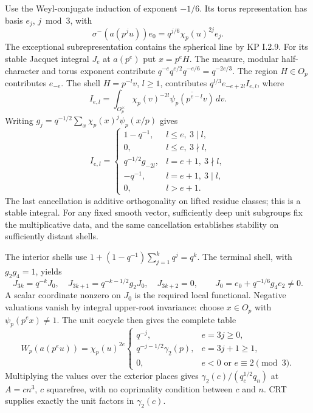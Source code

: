 \documentclass[11pt,a4paper]{article}
\numberwithin{equation}{section}
\theoremstyle{definition}
\theoremstyle{remark}
\newcommand{\dd}{\,d}
\begin{document}
Use the Weyl-conjugate induction of exponent $-1/6$. Its torus representation has basis $e_j$, $j\bmod3$, with
\[
 \sigma^-(a(p^ju))e_0=q^{j/6}\chi_p(u)^{2j}e_j.
\]
The exceptional subrepresentation contains the spherical line by KP I.2.9. For its stable Jacquet integral $J_e$ at $a(p^e)$ put $x=p^eH$. The measure, modular half-character and torus exponent contribute
$q^{-e}q^{e/2}q^{-e/6}=q^{-2e/3}$.
The region $H\in O_p$ contributes $e_{-e}$. The shell $H=p^{-l}v$, $l\ge1$, contributes $q^{l/3}e_{-e+2l}I_{e,l}$, where
\[
 I_{e,l}=\int_{O_p^\times}\chi_p(v)^{-2l}
                       \overline{\psi_p(p^{e-l}v)}\dd v.
\]
Writing $g_j=q^{-1/2}\sum_x\chi_p(x)^j\psi_p(x/p)$ gives
\[
 I_{e,l}=
 \begin{cases}
 1-q^{-1},&l\le e,\ 3\mid l,\\
 0,&l\le e,\ 3\nmid l,\\
 q^{-1/2}g_{-2l},&l=e+1,\ 3\nmid l,\\
 -q^{-1},&l=e+1,\ 3\mid l,\\
 0,&l>e+1.
 \end{cases}
\]
The last cancellation is additive orthogonality on lifted residue classes; this is a stable integral. For any fixed smooth vector, sufficiently deep unit subgroups fix the multiplicative data, and the same cancellation establishes stability on sufficiently distant shells.

The interior shells use
$1+(1-q^{-1})\sum_{j=1}^kq^j=q^k$.
The terminal shell, with $g_2g_4=1$, yields
\[
 J_{3k}=q^{-k}J_0,\quad
 J_{3k+1}=q^{-k-1/2}g_2J_0,\quad
 J_{3k+2}=0,\qquad J_0=e_0+q^{-1/6}g_4e_2\ne0.
\]
A scalar coordinate nonzero on $J_0$ is the required local functional. Negative valuations vanish by integral upper-root invariance: choose $x\in O_p$ with $\psi_p(p^ex)\ne1$. The unit cocycle then gives the complete table
\begin{equation}\label{eq:Wtable}
 W_p(a(p^eu))=\chi_p(u)^{2e}
 \begin{cases}
 q^{-j},&e=3j\ge0,\\
 q^{-j-1/2}\gamma_2(p),&e=3j+1\ge1,\\
 0,&e<0\text{ or }e\equiv2\pmod3.
 \end{cases}
\end{equation}
Multiplying the values over the exterior places gives
$\gamma_2(c)/(q_c^{1/2}q_n)$ at $A=cn^3$, $c$ squarefree, with no coprimality condition between $c$ and $n$. CRT supplies exactly the unit factors in $\gamma_2(c)$.
\end{document}
